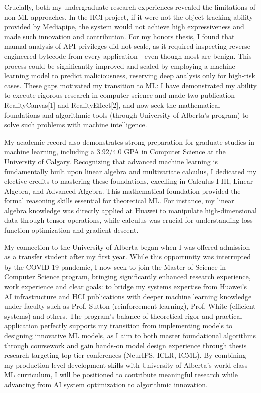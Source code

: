\documentclass{article}
\begin{document}
Crucially, both my undergraduate research experiences revealed the limitations of non-ML approaches. In the HCI project, if it were not the object tracking ability provided by Mediapipe, the system would not achieve high expressiveness 
and made such innovation and contribution. 
For my honors thesis, I found that manual analysis of API privileges did not scale, as it required inspecting reverse-engineered bytecode from every application—even though most are benign. This process could be significantly improved and scaled by employing a machine learning model to predict maliciousness, reserving deep analysis only for high-risk cases. These gaps motivated my transition to ML: I have demonstrated my ability to execute rigorous research in computer science and made two publication RealityCanvas[1] and RealityEffect[2], and now seek the mathematical foundations and algorithmic tools (through University of Alberta's program) to solve such problems with machine intelligence.

My academic record also demonstrates strong preparation for graduate studies in machine learning, including a 3.92/4.0 GPA in Computer Science at the University of Calgary. Recognizing that advanced machine learning is fundamentally built upon linear algebra and multivariate calculus, I dedicated my elective credits to mastering these foundations, excelling in Calculus I-III, Linear Algebra, and Advanced Algebra. This mathematical foundation provided the formal reasoning skills essential for theoretical ML. For instance, my linear algebra knowledge was directly applied at Huawei to manipulate high-dimensional data through tensor operations, while calculus was crucial for understanding loss function optimization and gradient descent.

My connection to the University of Alberta began when I was offered admission as a transfer student after my first year. While this opportunity was interrupted by the COVID-19 pandemic, I now seek to join the Master of Science in Computer Science program, bringing significantly enhanced research experience, work experience and clear goals: to bridge my systems expertise from Huawei's AI infrastructure and HCI publications with deeper machine learning knowledge under faculty such as Prof. Sutton (reinforcement learning), Prof. White (efficient systems) and others. The program's balance of theoretical rigor and practical application perfectly supports my transition from implementing models to designing innovative ML models, as I aim to both master foundational algorithms through coursework and gain hands-on model design experience through thesis research targeting top-tier conferences (NeurIPS, ICLR, ICML). By combining my production-level development skills with University of Alberta's world-class ML curriculum, I will be positioned to contribute meaningful research while advancing from AI system optimization to algorithmic innovation.
\end{document}
